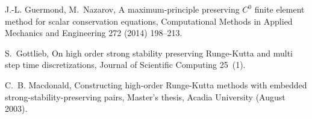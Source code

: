 \documentclass[xchauthor,chkrefs,fixeqskip,GCNS,amsmath,amsthm]{yjcphg}
\theoremstyle{remark}
\begin{document}
\begin{backmatter}
\begin{thebibliography}{}
\begin{bsubitem}
\begin{bcontribution}%
\end{bcontribution}
\begin{bhost}
\begin{bissue}
\end{bissue}
\end{bhost}
\end{bsubitem}
%
\OrigBibText
J.-L. Guermond, M.~Nazarov, A maximum-principle preserving {$C^{0}$}
finite element method for scalar conservation equations, Computational
Methods in Applied Mechanics and Engineering 272 (2014) 198--213.
\endOrigBibText
{}%
\endbibitem

\begin{bsubitem}
\begin{bcontribution}%
\end{bcontribution}
\begin{bhost}
\begin{bissue}
\end{bissue}
\end{bhost}
\end{bsubitem}
%
\OrigBibText
S.~Gottlieb, On high order strong stability preserving {R}unge-{K}utta
and multi step time discretizations, Journal of Scientific Computing
25~(1).
\endOrigBibText
{}%
\endbibitem

\begin{bsubitem}
\begin{bcontribution}%
\end{bcontribution}
\prnsep{,\ }
\begin{bhost}
\begin{bbook}[class=report]
\end{bbook}
\end{bhost}
\end{bsubitem}
%
\OrigBibText
C.~B. Macdonald, Constructing high-order {R}unge-{K}utta methods with
embedded strong-stability-preserving pairs, Master's thesis, Acadia
University (August 2003).
\endOrigBibText
{}%
\endbibitem


\end{thebibliography}
\end{backmatter}
\end{document}
